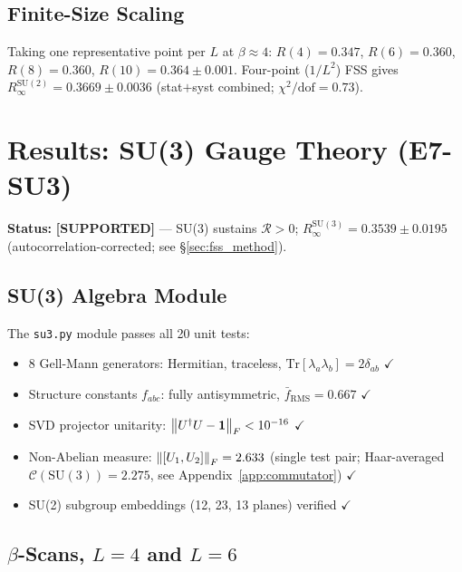 \documentclass[12pt,a4paper]{article}
\newcommand{\R}{\mathcal{R}}           %
\newcommand{\SU}[1]{\mathrm{SU}(#1)}
\newcommand{\supported}{\textcolor{blue!70!black}{\textbf{[SUPPORTED]}}}
\theoremstyle{plain}
\theoremstyle{definition}
\theoremstyle{remark}
\begin{document}
\subsection{Finite-Size Scaling}

Taking one representative point per $L$ at $\beta\approx 4$:
$R(4)=0.347$, $R(6)=0.360$, $R(8)=0.360$, $R(10)=0.364\pm0.001$.
Four-point ($1/L^2$) FSS gives $R_\infty^{\SU{2}}=0.3669\pm0.0036$ (stat$+$syst combined; $\chi^2/\text{dof}=0.73$).

\section{Results: SU(3) Gauge Theory (E7-SU3)}
\label{sec:su3}

\begin{statusbox}
\textbf{Status:} \supported{} --- SU(3) sustains $\R>0$; $R_\infty^{\SU{3}}=0.3539\pm0.0195$ (autocorrelation-corrected; see §\ref{sec:fss_method}).
\end{statusbox}

\subsection{SU(3) Algebra Module}

The \texttt{su3.py} module passes all 20 unit tests:
\begin{itemize}
  \item 8 Gell-Mann generators: Hermitian, traceless, $\mathrm{Tr}[\lambda_a\lambda_b]=2\delta_{ab}$ $\checkmark$
  \item Structure constants $f_{abc}$: fully antisymmetric, $\bar{f}_\text{RMS}=0.667$ $\checkmark$
  \item SVD projector unitarity: $\norm{U^\dagger U-\mathbf{1}}_F<10^{-16}$ $\checkmark$
  \item Non-Abelian measure: $\norm{[U_1,U_2]}_F=2.633$ (single test pair; Haar-averaged $\mathcal{C}(\SU{3})=2.275$, see Appendix~\ref{app:commutator}) $\checkmark$
  \item SU(2) subgroup embeddings (12, 23, 13 planes) verified $\checkmark$
\end{itemize}

\subsection{$\beta$-Scans, $L=4$ and $L=6$}
\end{document}

